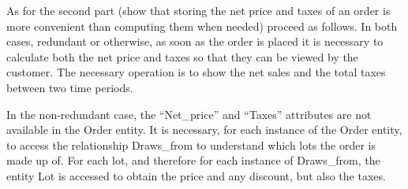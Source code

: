 As for the second part (show that storing the net price and taxes of an order is more convenient than computing them when needed) proceed as follows.
In both cases, redundant or otherwise, as soon as the order is placed it is necessary to calculate both the net price and taxes so that they can be viewed by the customer.
The necessary operation is to show the net sales and the total taxes between two time periods.

In the non-redundant case, the ``Net\_price'' and ``Taxes'' attributes are not available in the Order entity. It is necessary, for each instance of the Order entity, to access the relationship Draws\_from to understand which lots the order is made up of. For each lot, and therefore for each instance of Draws\_from, the entity Lot is accessed to obtain the price and any discount, but also the taxes.

